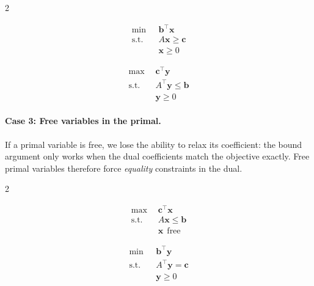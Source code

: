 \begin{multicols}{2}
\begin{tcolorbox}[title=Primal (P), colback=blue!5, colframe=blue!40!black]
\[
\begin{aligned}
\min\ & \mathbf{b}^\top \mathbf{x} \\
\text{s.t.} \quad & A \mathbf{x} \geq \mathbf{c} \\
& \mathbf{x} \geq 0
\end{aligned}
\]
\end{tcolorbox}

\columnbreak

\begin{tcolorbox}[title=Dual (D), colback=green!5, colframe=green!40!black]
\[
\begin{aligned}
\max\ & \mathbf{c}^\top \mathbf{y} \\
\text{s.t.} \quad & A^\top \mathbf{y} \leq \mathbf{b} \\
& \mathbf{y} \geq 0
\end{aligned}
\]
\end{tcolorbox}
\end{multicols}

\paragraph{Case 3: Free variables in the primal.}
If a primal variable is free, we lose the ability to relax its coefficient: the bound argument only works when the dual coefficients match the objective exactly.  Free primal variables therefore force \emph{equality} constraints in the dual.

\begin{multicols}{2}
\begin{tcolorbox}[title=Primal (P), colback=blue!5, colframe=blue!40!black]
\[
\begin{aligned}
\max\ & \mathbf{c}^\top \mathbf{x} \\
\text{s.t.} \quad & A \mathbf{x} \leq \mathbf{b} \\
& \mathbf{x} \ \ \text{free}
\end{aligned}
\]
\end{tcolorbox}

\columnbreak

\begin{tcolorbox}[title=Dual (D), colback=green!5, colframe=green!40!black]
\[
\begin{aligned}
\min\ & \mathbf{b}^\top \mathbf{y} \\
\text{s.t.} \quad & A^\top \mathbf{y} = \mathbf{c} \\
& \mathbf{y} \geq 0
\end{aligned}
\]
\end{tcolorbox}
\end{multicols}


